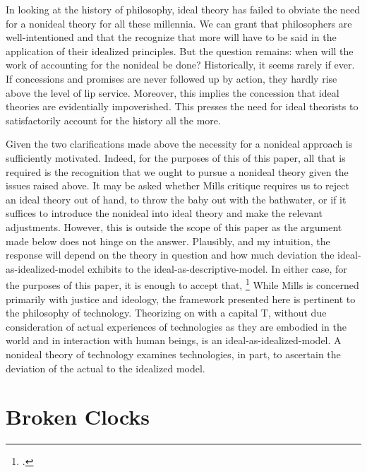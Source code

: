 \documentclass[letterpaper,notitlepage,12pt]{article}
\begin{document}
In looking at the history of philosophy, ideal theory has failed to obviate the
need for a nonideal theory for all these millennia.
We can grant that philosophers are well-intentioned and that the recognize that
more will have to be said in the application of their idealized principles.
But the question remains: when will the work of accounting for the nonideal be
done?
Historically, it seems rarely if ever.
If concessions and promises are never followed up by action, they hardly rise
above the level of lip service.
Moreover, this implies the concession that ideal theories are evidentially
impoverished.
This presses the need for ideal theorists to satisfactorily account for the
history all the more.

Given the two clarifications made above the necessity for a nonideal approach is
sufficiently motivated.
Indeed, for the purposes of this of this paper, all that is required is the
recognition that we ought to pursue a nonideal theory given the issues raised
above.
It may be asked whether Mills critique requires us to reject an ideal theory out
of hand, to throw the baby out with the bathwater, or if it suffices to
introduce the nonideal into ideal theory and make the relevant adjustments.
However, this is outside the scope of this paper as the argument made below does
not hinge on the answer.
Plausibly, and my intuition, the response will depend on the theory in question
and how much deviation the ideal-as-idealized-model exhibits to the
ideal-as-descriptive-model.
In either case, for the purposes of this paper, it is enough to accept that,
\footcite[p.
177]{mills_ideal_2005}
While Mills is concerned primarily with justice and ideology, the framework
presented here is pertinent to the philosophy of technology.
Theorizing on  with a capital T, without due consideration
of actual experiences of technologies as they are embodied in the world and in
interaction with human beings, is an ideal-as-idealized-model.
A nonideal theory of technology examines technologies, in part, to ascertain the
deviation of the actual to the idealized model.

\section{Broken Clocks}
\end{document}
